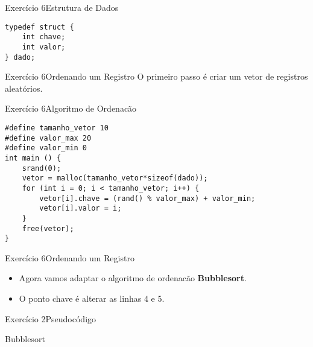 \documentclass[aspectratio=169]{beamer}
\begin{document}

\begin{frame}[fragile]{Exercício 6}{Estrutura de Dados}
\begin{lstlisting}[style=CStyle]
typedef struct {
    int chave;
    int valor;
} dado;

\end{lstlisting}
\end{frame}


\begin{frame}[fragile]{Exercício 6}{Ordenando um Registro}
O primeiro passo é criar um vetor de registros aleatórios.
\end{frame}


\begin{frame}[fragile]{Exercício 6}{Algoritmo de Ordenacão}
\begin{lstlisting}[style=CStyle]
#define tamanho_vetor 10
#define valor_max 20
#define valor_min 0
int main () {
    srand(0);
    vetor = malloc(tamanho_vetor*sizeof(dado));
    for (int i = 0; i < tamanho_vetor; i++) {
        vetor[i].chave = (rand() % valor_max) + valor_min;
        vetor[i].valor = i;
    }
    free(vetor);
}
\end{lstlisting}
\end{frame}


\begin{frame}[fragile]{Exercício 6}{Ordenando um Registro}
\begin{itemize}
\item Agora vamos adaptar o algoritmo de ordenacão {\bf Bubblesort}.
\item O ponto chave é alterar as linhas 4 e 5.
\end{itemize}

\end{frame}


\begin{frame}[fragile]{Exercício 2}{Pseudocódigo}
\begin{algorithm}[H]
\caption{Bubblesort} 
\label{Bubblesort}
\end{algorithm}
\end{frame}
\end{document}
